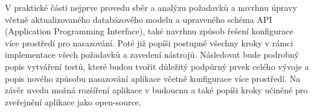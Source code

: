 V praktické části nejprve provedu sběr a analýzu požadavků a navrhnu úpravy včetně aktualizovaného databázového modelu a upraveného schéma API (Application Programming Interface), také navrhnu způsob řešení konfigurace více prostředí pro nasazování. Poté již popíši postupně všechny kroky v rámci implementace všech požadavků a zavedení nástrojů. Následovat bude podrobný popis vytváření testů, které budou tvořit důležitý podpůrný prvek celého vývoje a popis nového způsobu nasazování aplikace včetně konfigurace více prostředí. Na závěr uvedu možná rozšíření aplikace v budoucnu a také popíši kroky učiněné pro zveřejnění aplikace jako open-source.